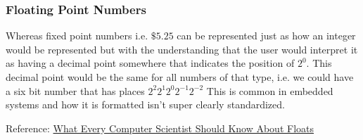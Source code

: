 \documentclass[10pt]{article}
\begin{document}
\subsubsection{Floating Point Numbers}


Whereas fixed point numbers i.e. $ \$5.25 $ can be represented just as how an integer would be represented but with the understanding that the user would interpret it as having a decimal point somewhere that indicates the position of $ 2^0 $.
This decimal point would be the same for all numbers of that type, i.e. we could have a six bit number that has places $ 2^2 2^1 2^0 2^{-1} 2^{-2} $ 
This is common in embedded systems and how it is formatted isn't super clearly standardized.

\begin{lemma}
	Reference: \href{https://www.eecg.utoronto.ca/~moshovos/ECE352-2022/00.practice/What\%20Every\%20Computer\%20Scientist\%20Should\%20Know\%20About\%20Floating-Point\%20Arithmetic.htm}{What Every Computer Scientist Should Know About Floats}
\end{lemma}
\end{document}
